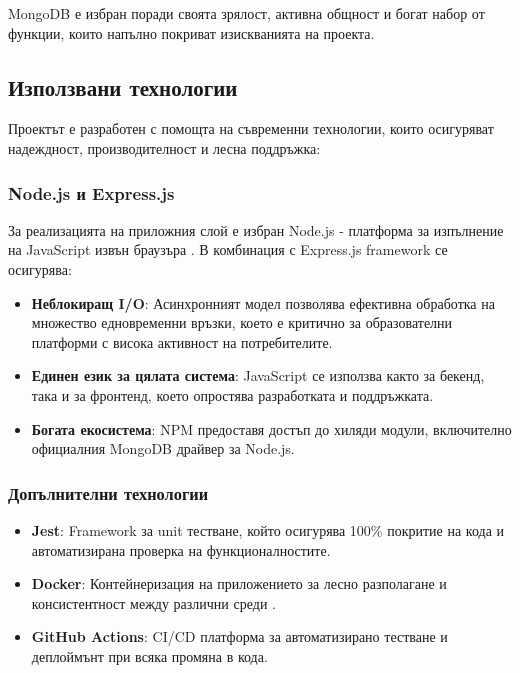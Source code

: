 MongoDB е избран поради своята зрялост, активна общност и богат набор от функции, които напълно покриват изискванията на проекта.

\subsection{Използвани технологии}

Проектът е разработен с помощта на съвременни технологии, които осигуряват надеждност, производителност и лесна поддръжка:

\subsubsection{Node.js и Express.js}

За реализацията на приложния слой е избран Node.js - платформа за изпълнение на JavaScript извън браузъра \cite{nodejs_docs}. В комбинация с Express.js framework се осигурява:

\begin{itemize}
    \item \textbf{Неблокиращ I/O}: Асинхронният модел позволява ефективна обработка на множество едновременни връзки, което е критично за образователни платформи с висока активност на потребителите.

    \item \textbf{Единен език за цялата система}: JavaScript се използва както за бекенд, така и за фронтенд, което опростява разработката и поддръжката.

    \item \textbf{Богата екосистема}: NPM предоставя достъп до хиляди модули, включително официалния MongoDB драйвер за Node.js.
\end{itemize}

\subsubsection{Допълнителни технологии}

\begin{itemize}
    \item \textbf{Jest}: Framework за unit тестване, който осигурява 100\% покритие на кода и автоматизирана проверка на функционалностите.

    \item \textbf{Docker}: Контейнеризация на приложението за лесно разполагане и консистентност между различни среди \cite{docker_docs}.

    \item \textbf{GitHub Actions}: CI/CD платформа за автоматизирано тестване и деплоймънт при всяка промяна в кода.
\end{itemize}

